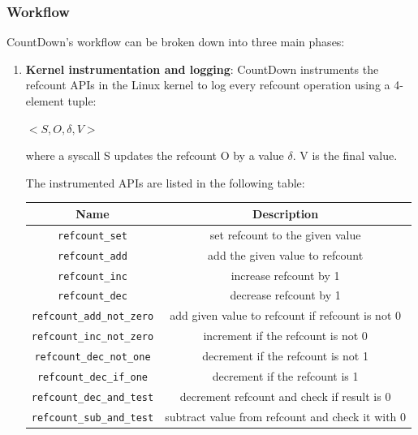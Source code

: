\subsubsection{Workflow}
CountDown's workflow can be broken down into three main phases:
\begin{enumerate}
    \item \textbf{Kernel instrumentation and logging}: CountDown instruments the refcount APIs in the Linux kernel to log every refcount operation using a 4-element tuple:
    \begin{center}
        $<S, O, \delta, V>$
    \end{center}
    where a syscall S updates the refcount O by a value $\delta$. V is the final value.

    The instrumented APIs are listed in the following table:

    \begin{center}
        \begin{tabular}{|c|c|}
            \hline
            \textbf{Name} & \textbf{Description} \\\hline
            \texttt{refcount\_set} & set refcount to the given value \\\hline
            \texttt{refcount\_add} & add the given value to refcount \\\hline
            \texttt{refcount\_inc} & increase refcount by 1 \\\hline
            \texttt{refcount\_dec} & decrease refcount by 1 \\\hline
            \texttt{refcount\_add\_not\_zero} & add given value to refcount if refcount is not 0 \\\hline
            \texttt{refcount\_inc\_not\_zero} & increment if the refcount is not 0 \\\hline
            \texttt{refcount\_dec\_not\_one} & decrement if the refcount is not 1 \\\hline
            \texttt{refcount\_dec\_if\_one} & decrement if the refcount is 1 \\\hline
            \texttt{refcount\_dec\_and\_test} & decrement refcount and check if result is 0 \\\hline
            \texttt{refcount\_sub\_and\_test} & subtract value from refcount and check it with 0 \\\hline
        \end{tabular}
        \label{table:refcounts}
    \end{center}
    

\end{enumerate}
